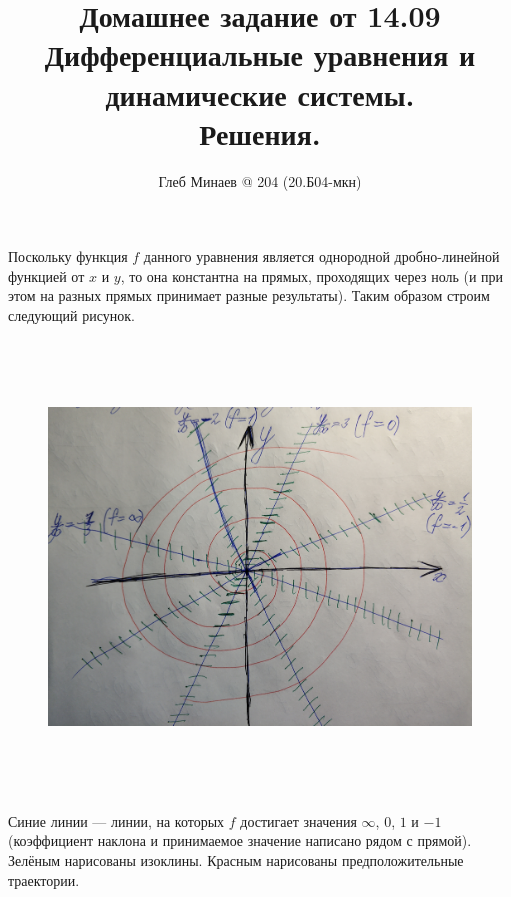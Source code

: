 \documentclass[12pt,a4paper]{article}
\title{Домашнее задание от 14.09\\Дифференциальные уравнения и динамические системы.\\Решения.}
\author{Глеб Минаев @ 204 (20.Б04-мкн)}
\begin{document}
    \maketitle

    \begin{problem}{11}
        Поскольку функция $f$ данного уравнения является однородной дробно-линейной функцией от $x$ и $y$, то она константна на прямых, проходящих через ноль (и при этом на разных прямых принимает разные результаты). Таким образом строим следующий рисунок.
        \begin{figure}[H]
            \centering
            \includegraphics[height=12cm]{DEaDS-HW-002-1.jpg}
        \end{figure}
        Синие линии --- линии, на которых $f$ достигает значения $\infty$, $0$, $1$ и $-1$ (коэффициент наклона и принимаемое значение написано рядом с прямой). Зелёным нарисованы изоклины. Красным нарисованы предположительные траектории. 
    \end{problem}
\end{document}
